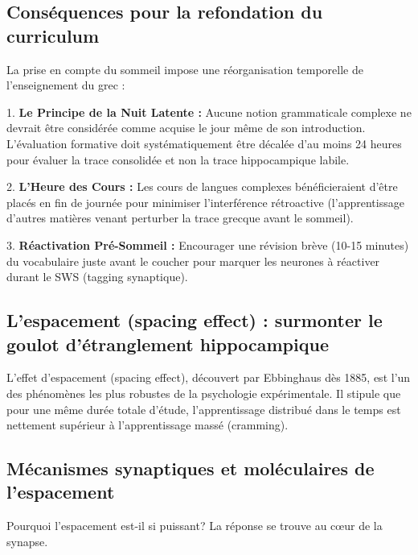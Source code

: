 \subsection{Conséquences pour la refondation du curriculum}

La prise en compte du sommeil impose une réorganisation temporelle de l'enseignement du grec :

1. \textbf{Le Principe de la Nuit Latente :} Aucune notion grammaticale complexe ne devrait être
considérée comme acquise le jour même de son introduction. L'évaluation formative doit
systématiquement être décalée d'au moins 24 heures pour évaluer la trace consolidée et non la trace
hippocampique labile.

2. \textbf{L'Heure des Cours :} Les cours de langues complexes bénéficieraient d'être placés en fin
de journée pour minimiser l'interférence rétroactive (l'apprentissage d'autres matières venant
perturber la trace grecque avant le sommeil).\cite{III-3-1-ref21}

3. \textbf{Réactivation Pré-Sommeil :} Encourager une révision brève (10-15 minutes) du vocabulaire
juste avant le coucher pour \og marquer\fg{} les neurones à réactiver durant le SWS (tagging
synaptique).\cite{III-3-1-ref22}



\subsection{L'espacement (spacing effect) : surmonter le goulot d'étranglement hippocampique}

L'effet d'espacement (spacing effect), découvert par Ebbinghaus dès 1885, est l'un des phénomènes
les plus robustes de la psychologie expérimentale. Il stipule que pour une même durée totale
d'étude, l'apprentissage distribué dans le temps est nettement supérieur à l'apprentissage massé
(\og cramming\fg{}).



\subsection{Mécanismes synaptiques et moléculaires de l'espacement}

Pourquoi l'espacement est-il si puissant? La réponse se trouve au cœur de la synapse.

